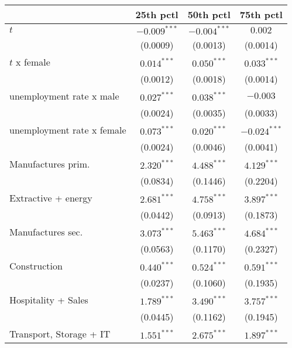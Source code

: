 \begin{tabular}{l|ccc|}
\toprule
{} &       25th pctl &       50th pctl &       75th pctl \\
\midrule
$t$                              &  $-0.009^{***}$ &  $-0.004^{***}$ &         $0.002$ \\
                                 &        (0.0009) &        (0.0013) &        (0.0014) \\
$t$ x female                     &   $0.014^{***}$ &   $0.050^{***}$ &   $0.033^{***}$ \\
                                 &        (0.0012) &        (0.0018) &        (0.0014) \\
unemployment rate x male         &   $0.027^{***}$ &   $0.038^{***}$ &        $-0.003$ \\
                                 &        (0.0024) &        (0.0035) &        (0.0033) \\
unemployment rate x female       &   $0.073^{***}$ &   $0.020^{***}$ &  $-0.024^{***}$ \\
                                 &        (0.0024) &        (0.0046) &        (0.0041) \\
Manufactures prim.               &   $2.320^{***}$ &   $4.488^{***}$ &   $4.129^{***}$ \\
                                 &        (0.0834) &        (0.1446) &        (0.2204) \\
Extractive + energy              &   $2.681^{***}$ &   $4.758^{***}$ &   $3.897^{***}$ \\
                                 &        (0.0442) &        (0.0913) &        (0.1873) \\
Manufactures sec.                &   $3.073^{***}$ &   $5.463^{***}$ &   $4.684^{***}$ \\
                                 &        (0.0563) &        (0.1170) &        (0.2327) \\
Construction                     &   $0.440^{***}$ &   $0.524^{***}$ &   $0.591^{***}$ \\
                                 &        (0.0237) &        (0.1060) &        (0.1935) \\
Hospitality + Sales              &   $1.789^{***}$ &   $3.490^{***}$ &   $3.757^{***}$ \\
                                 &        (0.0445) &        (0.1162) &        (0.1945) \\
Transport, Storage + IT          &   $1.551^{***}$ &   $2.675^{***}$ &   $1.897^{***}$ \\

\end{tabular}
